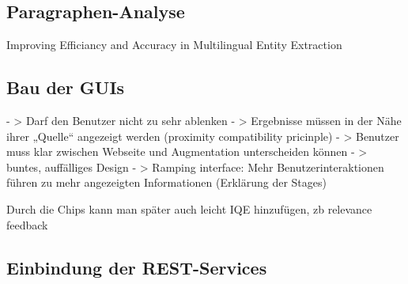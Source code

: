  \subsection{Paragraphen-Analyse}
  Improving Efficiancy and Accuracy in Multilingual Entity Extraction

 \subsection{Bau der GUIs}
		- > Darf den Benutzer nicht zu sehr ablenken
		- > Ergebnisse müssen in der Nähe ihrer „Quelle“ angezeigt werden (proximity compatibility pricinple)
		- > Benutzer muss klar zwischen Webseite und Augmentation unterscheiden können
		- > buntes, auffälliges Design
		- > Ramping interface: Mehr Benutzerinteraktionen führen zu mehr angezeigten Informationen (Erklärung der Stages) 


 Durch die Chips kann man später auch leicht IQE hinzufügen, zb relevance feedback
 \subsection{Einbindung der REST-Services}